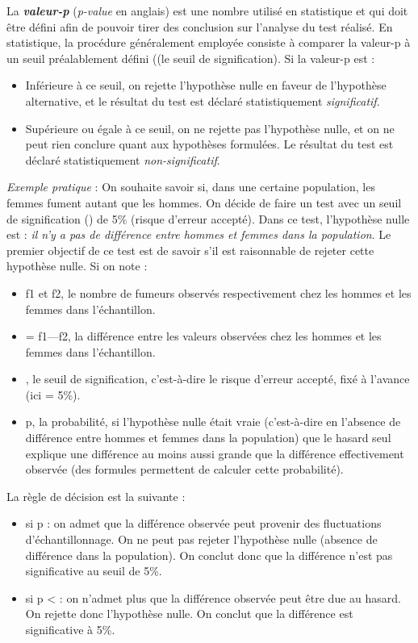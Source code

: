 \documentclass[10pt, oneside, a4paper]{article}
\begin{document}
La \textbf{\textit{valeur-p}} (\textit{p-value} en anglais) est une nombre utilisé en statistique et qui doit être défini afin de pouvoir tirer des conclusion sur l'analyse du test réalisé. En statistique, la procédure généralement employée consiste à comparer la valeur-p à un seuil préalablement défini ((le seuil de signification). Si la valeur-p est :
\begin{itemize}
\item Inférieure à ce seuil, on rejette l'hypothèse nulle en faveur de l’hypothèse alternative, et le résultat du test est déclaré statistiquement \textit{significatif}.
\item Supérieure ou égale à ce seuil, on ne rejette pas l’hypothèse nulle, et on ne peut rien conclure quant aux hypothèses formulées. Le résultat du test est déclaré statistiquement \textit{non-significatif}.\\
\end{itemize}
\textit{Exemple pratique} :  On souhaite savoir si, dans une certaine population, les femmes fument autant que les hommes. On décide de faire un test avec un seuil de signification (\alpha) de 5\% (risque d'erreur accepté). Dans ce test, l'hypothèse nulle est : \textit{il n'y a pas de différence entre hommes et femmes dans la population}. Le premier objectif de ce test est de savoir s'il est raisonnable de rejeter cette hypothèse nulle.
Si on note :
\begin{itemize}
\item f1 et f2, le nombre de fumeurs observés respectivement chez les hommes et les femmes dans l'échantillon.
\item {\delta} = f1—f2, la différence entre les valeurs observées chez les hommes et les femmes dans l'échantillon.
\item \alpha, le seuil de signification, c'est-à-dire le risque d'erreur accepté, fixé à l'avance (ici {\alpha} = 5\%).
\item p, la probabilité, si l'hypothèse nulle était vraie (c'est-à-dire en l'absence de différence entre hommes et femmes dans la population) que le hasard seul explique une différence au moins aussi grande que la différence {\delta} effectivement observée (des formules permettent de calculer cette probabilité).
\end{itemize}
La règle de décision est la suivante :
\begin{itemize}
\item si p {\geq} {\alpha} : on admet que la différence observée peut provenir des fluctuations d'échantillonnage. On ne peut pas rejeter l'hypothèse nulle (absence de différence dans la population). On conclut donc que la différence n'est pas significative au seuil de 5\%.
\item si p < {\alpha} : on n'admet plus que la différence observée peut être due au hasard. On rejette donc l'hypothèse nulle. On conclut que la différence est significative à 5\%. \\
\end{itemize}
\end{document}
